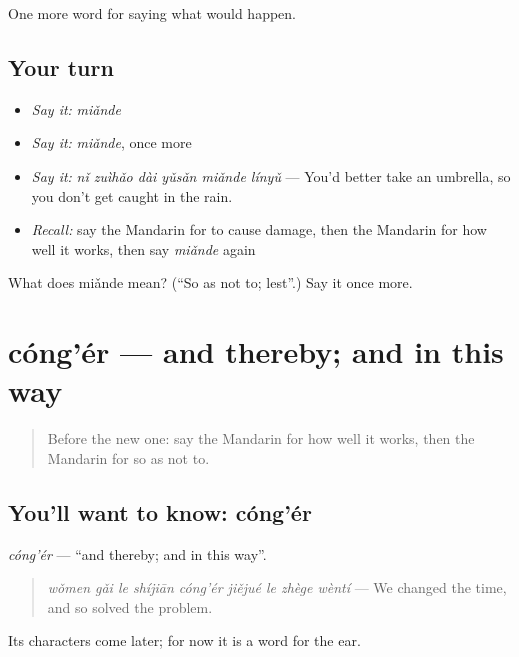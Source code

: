 \begin{grammarlens}[title={What you've built}]
One more word for saying what would happen.
\end{grammarlens}

\subsection*{Your turn}
\begin{itemize}
\raggedright
  \item \emph{Say it:} \emph{miǎnde}
  \item \emph{Say it:} \emph{miǎnde}, once more
  \item \emph{Say it:} \emph{nǐ zuìhǎo dài yǔsǎn miǎnde línyǔ} — You'd better take an umbrella, so you don't get caught in the rain.
  \item \emph{Recall:} say the Mandarin for to cause damage, then the Mandarin for how well it works, then say \emph{miǎnde} again
\end{itemize}

\begin{tcolorbox}[breakable,colback=teal!4,colframe=teal!35!black,title={Before you move on}]
What does miǎnde mean? (\textquotedblleft{}So as not to; lest\textquotedblright{}.) Say it once more.
\end{tcolorbox}
\section[cóng'ér]{cóng'ér — and thereby; and in this way}

\label{lesson:ZH-C538-conger}



\begin{quote}
Before the new one: say the Mandarin for how well it works, then the Mandarin for so as not to.
\end{quote}

\subsection*{You'll want to know: cóng'ér}
\emph{cóng'ér} — \textquotedblleft{}and thereby; and in this way\textquotedblright{}.

\begin{quote}
\emph{wǒmen gǎi le shíjiān cóng'ér jiějué le zhège wèntí} — We changed the time, and so solved the problem.
\end{quote}

Its characters come later; for now it is a word for the ear.

